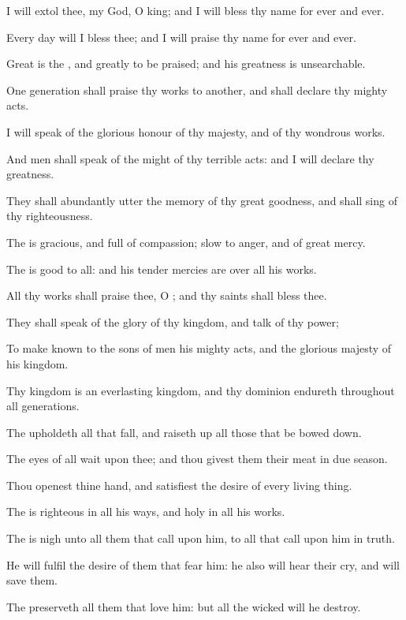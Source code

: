 \Chapter
\Verse I will extol thee, my God, O king; and I will bless thy name for ever and ever.

\Verse Every day will I bless thee; and I will praise thy name for ever and ever.

\Verse Great is the \LORD, and greatly to be praised; and his greatness is unsearchable.

\Verse One generation shall praise thy works to another, and shall declare thy mighty acts.

\Verse I will speak of the glorious honour of thy majesty, and of thy wondrous works.

\Verse And men shall speak of the might of thy terrible acts: and I will declare thy greatness.

\Verse They shall abundantly utter the memory of thy great goodness, and shall sing of thy righteousness.

\Verse The \LORD is gracious, and full of compassion; slow to anger, and of great mercy.

\Verse The \LORD is good to all: and his tender mercies are over all his works.

\Verse All thy works shall praise thee, O \LORD; and thy saints shall bless thee.

\Verse They shall speak of the glory of thy kingdom, and talk of thy power;

\Verse To make known to the sons of men his mighty acts, and the glorious majesty of his kingdom.

\Verse Thy kingdom is an everlasting kingdom, and thy dominion endureth throughout all generations.

\Verse The \LORD upholdeth all that fall, and raiseth up all those that be bowed down.

\Verse The eyes of all wait upon thee; and thou givest them their meat in due season.

\Verse Thou openest thine hand, and satisfiest the desire of every living thing.

\Verse The \LORD is righteous in all his ways, and holy in all his works.

\Verse The \LORD is nigh unto all them that call upon him, to all that call upon him in truth.

\Verse He will fulfil the desire of them that fear him: he also will hear their cry, and will save them.

\Verse The \LORD preserveth all them that love him: but all the wicked will he destroy.

